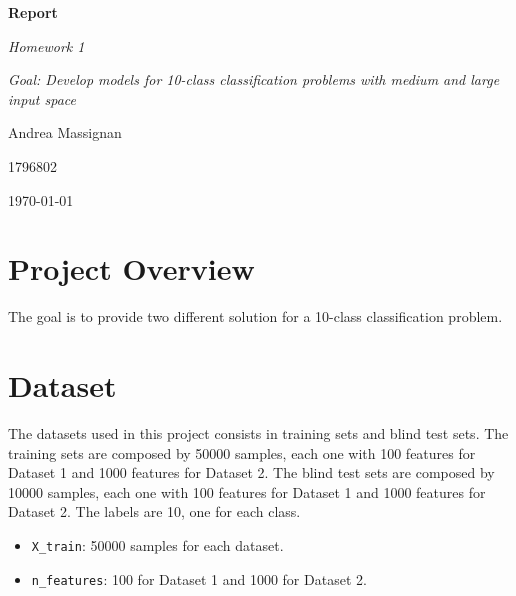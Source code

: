 \documentclass{article}
\begin{document}
\begin{titlepage}
  \centering
  \vspace*{2cm}
  {\Huge\bfseries Report\par}
  \vspace{2cm}
  {\Large\itshape Homework 1\par}
  \vspace{0.5cm}
  {\large\itshape Goal: Develop models for 10-class classification problems with medium and large input space\par}
  \vfill
  {\Large Andrea Massignan\par}
  {\Large 1796802\par}
  \vfill
  {\large\today\par}
\end{titlepage}

\section*{Project Overview}

The goal is to provide two different solution for a 10-class classification problem.

\section{Dataset}

The datasets used in this project consists in training sets and blind test sets.
The training sets are composed by 50000 samples, each one with 100 features for Dataset 1 and 1000 features for Dataset 2.
The blind test sets are composed by 10000 samples, each one with 100 features for Dataset 1 and 1000 features for Dataset 2.
The labels are 10, one for each class.

\begin{itemize}
  \item \texttt{X\_train}: 50000 samples for each dataset.
  \item \texttt{n\_features}: 100 for Dataset 1 and 1000 for Dataset 2.

\end{itemize}
\end{document}
